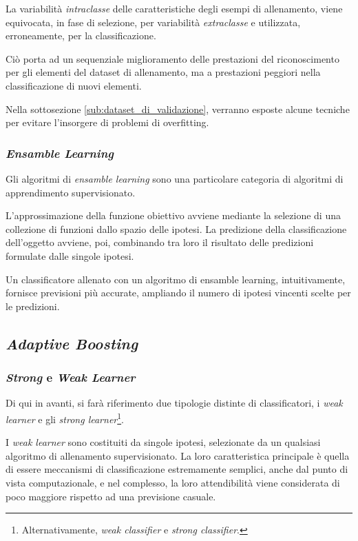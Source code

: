                 La variabilità \emph{intraclasse} delle caratteristiche degli esempi di allenamento, viene equivocata, in fase di selezione, per variabilità \emph{extraclasse} e utilizzata, erroneamente, per la classificazione.

                Ciò porta ad un sequenziale miglioramento delle prestazioni del riconoscimento per gli elementi del dataset di allenamento, ma a prestazioni peggiori nella classificazione di nuovi elementi.

                Nella sottosezione \ref{sub:dataset_di_validazione}, verranno esposte alcune tecniche per evitare l'insorgere di problemi di overfitting.

            \subsubsection{\emph{Ensamble Learning}}
                Gli algoritmi di \emph{ensamble learning} sono una particolare categoria di algoritmi di apprendimento supervisionato.

                L'approssimazione della funzione obiettivo avviene mediante la selezione di una collezione di funzioni dallo spazio delle ipotesi.
                La predizione della classificazione dell'oggetto avviene, poi, combinando tra loro il risultato delle predizioni formulate dalle singole ipotesi.
                
                Un classificatore allenato con un algoritmo di ensamble learning, intuitivamente, fornisce previsioni più accurate, ampliando il numero di ipotesi vincenti scelte per le predizioni.

        \subsection{\emph{Adaptive Boosting}}
        \label{sub:adaptive_boosting}
            \subsubsection{\emph{Strong} e \emph{Weak Learner}}
                Di qui in avanti, si farà riferimento due tipologie distinte di classificatori, i \emph{weak learner} e gli \emph{strong learner}\footnote{Alternativamente, \emph{weak classifier} e \emph{strong classifier}.}.

                I \emph{weak learner} sono costituiti da singole ipotesi, selezionate da un qualsiasi algoritmo di allenamento supervisionato.
                La loro caratteristica principale è quella di essere meccanismi di classificazione estremamente semplici, anche dal punto di vista computazionale, e nel complesso, la loro attendibilità viene considerata di poco maggiore rispetto ad una previsione casuale.

